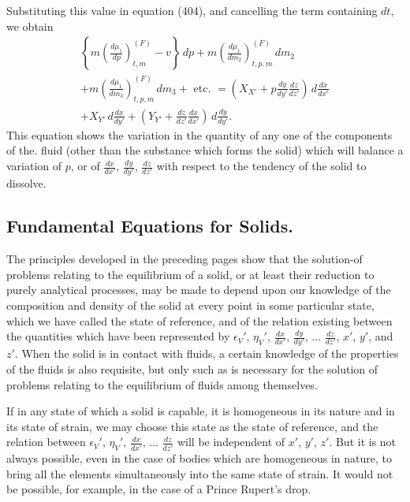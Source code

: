 \documentclass[12pt]{memoir}
\begin{document}
{Substituting this value in equation (404), and cancelling the term containing $dt$, we obtain
\begin{multline}
\left\{m\left( \frac{d \mu_1}{dp}\right)_{t,m}^{(F)} -v \right\}\, dp + m \left( \frac{d \mu_1}{dm_2}\right)_{t,p,m}^{(F)} \, dm_2 \\
+ m \left( \frac{d \mu_1}{dm_3}\right)_{t,p,m}^{(F)} \, dm_3
+ \text{ etc. } = \left(X_{X'} +p \frac{dy}{dy'}\frac{dz}{dz'}\right)\,d\frac{dx}{dx'} \\
+ X_{Y'}\, d \frac{dx}{dy'} +\left(Y_{Y'} +\frac{dz}{dz'}\frac{dx}{dx'}\right)\, d \frac{dy}{dy'}. \label{411} \end{multline}
This equation shows the variation in the quantity of any one of the components of the. fluid (other than the substance which forms the
solid) which will balance a variation of $p$, or of $\frac{dx}{dx'}$, $\frac{dy}{dy'}$, $\frac{dz}{dz'}$ with respect to the tendency of the solid to dissolve.

\subsection{Fundamental Equations for Solids.}
The principles developed in the preceding pages show that the solution-of problems relating to the equilibrium of a solid, or at least their reduction to purely analytical processes, may be made to depend upon our knowledge of the composition and density of the solid at every point in some particular state, which we have called the state of reference, and of the relation existing between the quantities which have been represented by $\epsilon_V'$, $\eta_V'$, $\frac{dx}{dx'}$, $\frac{dy}{dy'}$, ...  $\frac{dz}{dz'}$, $x'$, $y'$, and $z'$. When the solid is in contact with fluids, a certain knowledge of the properties of the fluids is also requisite, but only such as is necessary for the solution of problems relating to the equilibrium of fluids among themselves.


If in any state of which a solid is capable, it is homogeneous in its nature and in its state of strain, we may choose this state as the state
of reference, and the relation between $\epsilon_V'$, $\eta_V'$, $\frac{dx}{dx'}$, ...  $\frac{dz}{dz'}$ will be
independent of $x'$, $y'$, $z'$. But it is not always possible, even in the case of bodies which are homogeneous in nature, to bring all the elements simultaneously into the same state of strain. It would not be possible, for example, in the case of a Prince Rupert's drop.


}
\end{document}
